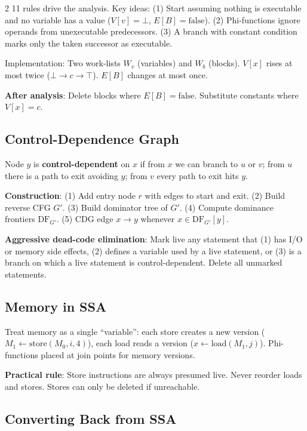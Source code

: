 \documentclass[9pt,landscape]{extarticle}
\begin{document}
\begin{multicols}{2}
11 rules drive the analysis. Key ideas: (1) Start assuming nothing is executable and no variable has a value ($V[v] = \bot$, $E[B] = \text{false}$). (2) Phi-functions ignore operands from unexecutable predecessors. (3) A branch with constant condition marks only the taken successor as executable.

Implementation: Two work-lists $W_v$ (variables) and $W_b$ (blocks). $V[x]$ rises at most twice ($\bot \to c \to \top$). $E[B]$ changes at most once.

\textbf{After analysis}: Delete blocks where $E[B] = \text{false}$. Substitute constants where $V[x] = c$.

\subsection{Control-Dependence Graph}

Node $y$ is \textbf{control-dependent} on $x$ if from $x$ we can branch to $u$ or $v$; from $u$ there is a path to exit avoiding $y$; from $v$ every path to exit hits $y$.

\textbf{Construction}: (1) Add entry node $r$ with edges to start and exit. (2) Build reverse CFG $G'$. (3) Build dominator tree of $G'$. (4) Compute dominance frontiers $\text{DF}_{G'}$. (5) CDG edge $x \to y$ whenever $x \in \text{DF}_{G'}[y]$.

\textbf{Aggressive dead-code elimination}: Mark live any statement that (1) has I/O or memory side effects, (2) defines a variable used by a live statement, or (3) is a branch on which a live statement is control-dependent. Delete all unmarked statements.

\subsection{Memory in SSA}

Treat memory as a single ``variable'': each store creates a new version ($M_1 \leftarrow \text{store}(M_0, i, 4)$), each load reads a version ($x \leftarrow \text{load}(M_1, j)$). Phi-functions placed at join points for memory versions.

\textbf{Practical rule}: Store instructions are always presumed live. Never reorder loads and stores. Stores can only be deleted if unreachable.

\subsection{Converting Back from SSA}


\end{multicols}
\end{document}
